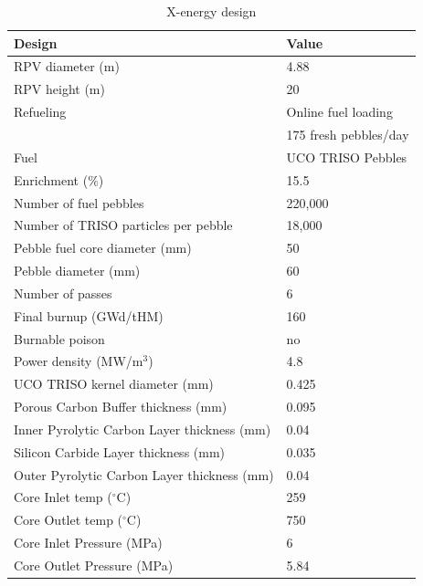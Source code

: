 \begin{table} [ht]
\begin{center}

\caption{ X-energy design}
\label{xtable}
\begin{tabular}{l l}
\hline 
Design 		&Value \\ 
\hline 
RPV diameter (m) 		&4.88 \\ 
RPV height (m) 		&20 \\ 
Refueling		&Online fuel loading  \\ 
	&175 fresh pebbles/day \\ 
Fuel		&UCO TRISO Pebbles \\ 
Enrichment (\%)		&15.5 \\ 
Number of fuel pebbles		&220,000 \\ 
Number of TRISO particles per pebble		&18,000 \\ 
Pebble fuel core diameter (mm)		&50 \\ 
Pebble diameter (mm)	&60 \\ 
Number of passes		&6\\ 
Final burnup (GWd/tHM)		&160 \\ 
Burnable poison		&no \\ 
Power density (MW/m$^3$)		&4.8 \\ 
UCO TRISO kernel diameter (mm)	&0.425 \\ 
Porous Carbon Buffer thickness (mm)	&0.095 \\ 
Inner Pyrolytic Carbon Layer thickness (mm) 	&0.04 \\ 
Silicon Carbide Layer thickness (mm)	&0.035 \\ 
Outer Pyrolytic Carbon Layer thickness (mm)	&0.04 \\ 
Core Inlet temp ($^\circ{}$C)	&259 \\ 
Core Outlet temp ($^\circ{}$C) 	&750 \\ 
Core Inlet Pressure (MPa)	&6 \\ 
Core Outlet Pressure (MPa)	&5.84 \\ 
\hline 

\end{tabular}
\end{center}
\end{table}

